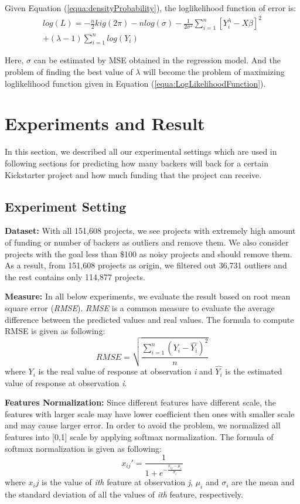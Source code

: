 Given Equation (\ref{equa:densityProbability}), the loglikelihood function of error is:
\begin{equation}
\label{equa:LogLikelihoodFunction}
\begin{aligned}
log(L) = -\frac{n}{2}kig(2\pi) -nlog(\sigma) - \frac{1}{2\sigma^2}\sum_{i=1}^{n}{[Y_i^\lambda - X\beta]^2}  \\ + (\lambda-1) \sum_{i=1}^{n}log(Y_i)
\end{aligned}
\end{equation}

Here, $\sigma$ can be estimated by MSE obtained in the regression model. And the problem of finding the best value of $\lambda$ will become the problem of maximizing loglikelihood function given in Equation (\ref{equa:LogLikelihoodFunction}). 




\section{Experiments and Result}

In this section, we described all our experimental settings which are used in following sections for predicting how many backers will back for a certain Kickstarter project and how much funding that the project can receive.

\subsection{Experiment Setting}

\textbf{Dataset:} With all 151,608 projects, we see projects with extremely high amount of funding or number of backers as outliers and remove them. We also consider projects with the goal less than \$100 as noisy projects and should remove them. As a result, from 151,608 projects as origin, we filtered out 36,731 outliers and the rest contains only 114,877 projects.

\textbf{Measure:} In all below experiments, we evaluate the result based on root mean square error (\emph{RMSE}). \emph{RMSE} is a common measure to evaluate the average difference between the predicted values and  real values. The formula to compute RMSE is given as following:
\[
	RMSE = \sqrt{\frac{\sum_{i=1}^{n}{(Y_i-\widehat{Y_i})^2}}{n}}
\]
where $Y_i$ is the real value of response at observation \emph{i} and $\widehat{Y_i}$ is the estimated value of response at observation \emph{i}.

\textbf{Features Normalization:} Since different features have different scale, the features with larger scale may have lower coefficient then ones with smaller scale and may cause larger error. In order to avoid the problem, we normalized all features into [0,1] scale by applying softmax normalization. The formula of softmax normalization is given as following:
\[
	x_{ij}\prime = \frac{1}{1 + e^{-\frac{x_{ij}-\mu_i}{\sigma_i}}}
\]
where $x_ij$ is the value of \emph{ith} feature at observation \emph{j}, $\mu_i$ and $\sigma_i$ are the mean and the standard deviation of all the values of \emph{ith} feature, respectively.

